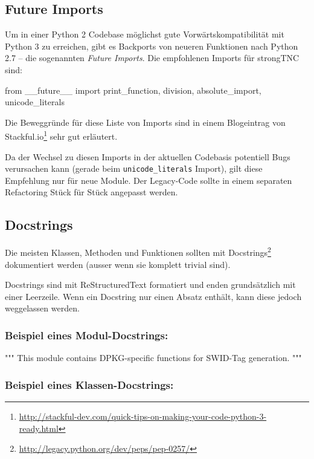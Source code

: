 \subsection{Future Imports}

Um in einer Python 2 Codebase möglichst gute Vorwärtskompatibilität mit Python 3
zu erreichen, gibt es Backports von neueren Funktionen nach Python 2.7 -- die
sogenannten \textit{Future Imports}. Die empfohlenen Imports für strongTNC sind:

\begin{pythoncode}
from __future__ import print_function, division, absolute_import, unicode_literals
\end{pythoncode}

\noindent Die Beweggründe für diese Liste von Imports sind in einem Blogeintrag
von Stackful.io\footnote{\url{http://stackful-dev.com/quick-tips-on-making-your-code-python-3-ready.html}}
sehr gut erläutert.

Da der Wechsel zu diesen Imports in der aktuellen Codebasis potentiell Bugs
verursachen kann (gerade beim \texttt{unicode\_literals} Import), gilt diese
Empfehlung nur für neue Module. Der Legacy-Code sollte in einem separaten
Refactoring Stück für Stück angepasst werden.


\subsection{Docstrings}

Die meisten Klassen, Methoden und Funktionen sollten mit
Docstrings\footnote{\url{http://legacy.python.org/dev/peps/pep-0257/}}
dokumentiert werden (ausser wenn sie komplett trivial sind).

Docstrings sind mit ReStructuredText formatiert und enden grundsätzlich mit
einer Leerzeile. Wenn ein Docstring nur einen Absatz enthält, kann diese jedoch
weggelassen werden.

\subsubsection*{Beispiel eines Modul-Docstrings:}

\begin{pythoncode}
"""
This module contains DPKG-specific functions for SWID-Tag generation.
"""
\end{pythoncode}

\subsubsection*{Beispiel eines Klassen-Docstrings:}

